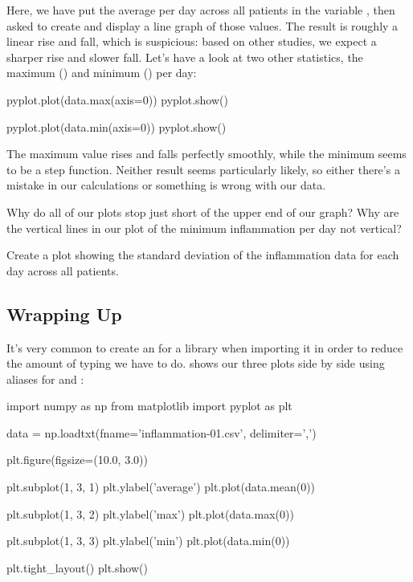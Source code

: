Here, we have put the average per day across all patients in the
variable , then asked  to
create and display a line graph of those values. The result is roughly a
linear rise and fall, which is suspicious: based on other studies, we
expect a sharper rise and slower fall. Let's have a look at two other
statistics, the maximum () and minimum () per day:

\begin{VerbIn}
pyplot.plot(data.max(axis=0))
pyplot.show()

pyplot.plot(data.min(axis=0))
pyplot.show()
\end{VerbIn}



The maximum value rises and falls perfectly smoothly, while the minimum
seems to be a step function. Neither result seems particularly likely,
so either there's a mistake in our calculations or something is wrong
with our data.

\begin{challenge}
  Why do all of our plots stop just short of the upper end of our graph?
  Why are the vertical lines in our plot of the minimum inflammation per
  day not vertical?
\end{challenge}

\begin{challenge}
  Create a plot showing the standard deviation of the inflammation data
  for each day across all patients.
\end{challenge}

\subsection{Wrapping Up}

It's very common to create an  for a
library when importing it in order to reduce the amount of typing we
have to do.  shows our three plots
side by side using aliases for  and :

\begin{VerbIn}
import numpy as np
from matplotlib import pyplot as plt

data = np.loadtxt(fname='inflammation-01.csv', delimiter=',')

plt.figure(figsize=(10.0, 3.0))

plt.subplot(1, 3, 1)
plt.ylabel('average')
plt.plot(data.mean(0))

plt.subplot(1, 3, 2)
plt.ylabel('max')
plt.plot(data.max(0))

plt.subplot(1, 3, 3)
plt.ylabel('min')
plt.plot(data.min(0))

plt.tight_layout()
plt.show()
\end{VerbIn}

